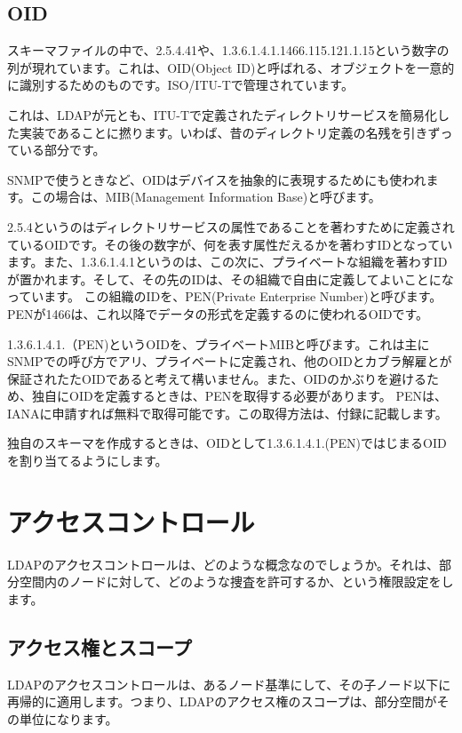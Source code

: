 \subsection{OID}

スキーマファイルの中で、2.5.4.41や、1.3.6.1.4.1.1466.115.121.1.15という数字の列が現れています。これは、OID(Object ID)と呼ばれる、オブジェクトを一意的に識別するためのものです。ISO/ITU-Tで管理されています。

これは、LDAPが元とも、ITU-Tで定義されたディレクトリサービスを簡易化した実装であることに撚ります。いわば、昔のディレクトリ定義の名残を引きずっている部分です。

SNMPで使うときなど、OIDはデバイスを抽象的に表現するためにも使われます。この場合は、MIB(Management Information Base)と呼びます。

2.5.4というのはディレクトリサービスの属性であることを著わすために定義されているOIDです。その後の数字が、何を表す属性だえるかを著わすIDとなっています。また、1.3.6.1.4.1というのは、この次に、プライベートな組織を著わすIDが置かれます。そして、その先のIDは、その組織で自由に定義してよいことになっています。
この組織のIDを、PEN(Private Enterprise Number)と呼びます。PENが1466は、これ以降でデータの形式を定義するのに使われるOIDです。

1.3.6.1.4.1.（PEN)というOIDを、プライベートMIBと呼びます。これは主にSNMPでの呼び方でアリ、プライベートに定義され、他のOIDとカブラ解雇とが保証されたたOIDであると考えて構いません。また、OIDのかぶりを避けるため、独自にOIDを定義するときは、PENを取得する必要があります。
PENは、IANAに申請すれば無料で取得可能です。この取得方法は、付録に記載します。

独自のスキーマを作成するときは、OIDとして1.3.6.1.4.1.(PEN)ではじまるOIDを割り当てるようにします。





\section{アクセスコントロール}

LDAPのアクセスコントロールは、どのような概念なのでしょうか。それは、部分空間内のノードに対して、どのような捜査を許可するか、という権限設定をします。

\subsection{アクセス権とスコープ}

LDAPのアクセスコントロールは、あるノード基準にして、その子ノード以下に再帰的に適用します。つまり、LDAPのアクセス権のスコープは、部分空間がその単位になります。

